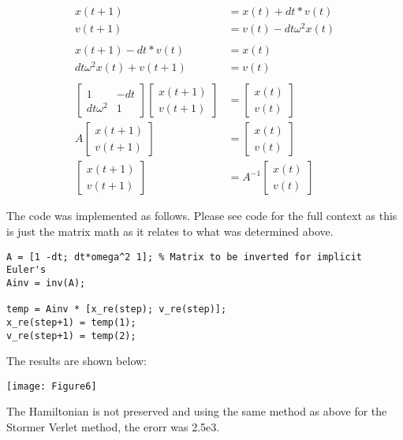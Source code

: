 \documentclass{article}
\begin{document}
\begin{align*}
x(t+1) &= x(t) + dt * v(t)\\
v(t+1) &= v(t) - dt  \omega^2 x(t)\\
\\
x(t+1) -  dt * v(t) &= x(t)\\
dt  \omega^2 x(t) + v(t+1) &= v(t) \\
\\
\begin{bmatrix}
1 & -dt\\
dt\omega^2 & 1 
\end{bmatrix}
\begin{bmatrix}
x(t+1) \\ v(t+1)
\end{bmatrix}
&= \begin{bmatrix}
x(t) \\ v(t)
\end{bmatrix}\\
A
\begin{bmatrix}
x(t+1) \\ v(t+1)
\end{bmatrix}
&= \begin{bmatrix}
x(t) \\ v(t)
\end{bmatrix}\\
\begin{bmatrix}
x(t+1) \\ v(t+1)
\end{bmatrix}
&= A^{-1} \begin{bmatrix}
x(t) \\ v(t)
\end{bmatrix}
\end{align*}

The code was implemented as follows. Please see code for the full context as this is just the matrix math as it relates to what was determined above.

\begin{verbatim}
A = [1 -dt; dt*omega^2 1]; % Matrix to be inverted for implicit Euler's
Ainv = inv(A);

temp = Ainv * [x_re(step); v_re(step)];
x_re(step+1) = temp(1);
v_re(step+1) = temp(2);
\end{verbatim}

 The results are shown below:

\texttt{[image: Figure6]}

The Hamiltonian is not preserved and using the same method as above for the Stormer Verlet method, the erorr was 2.5e3.
\end{document}

